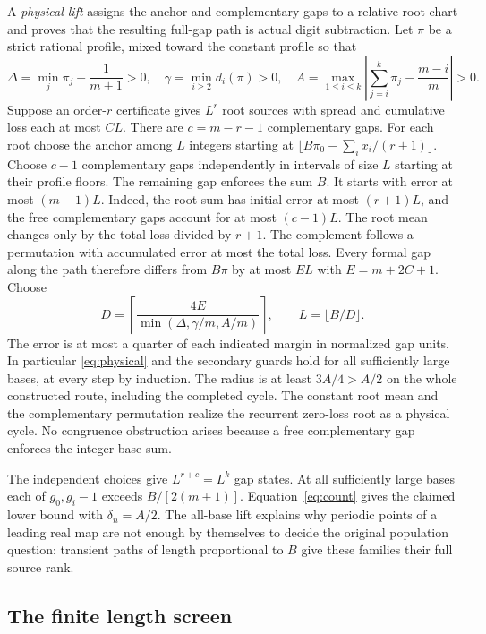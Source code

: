 \documentclass[11pt,reqno]{amsart}
\theoremstyle{remark}
\begin{document}
A \emph{physical lift} assigns the anchor and complementary gaps
to a relative root chart and proves that the resulting full-gap path
is actual digit subtraction. Let \(\pi\) be a strict rational profile,
mixed toward the constant profile so that
\[
 \Delta=\min_j\pi_j-\frac1{m+1}>0,\quad
 \gamma=\min_{i\ge2}d_i(\pi)>0,\quad
 A=\max_{1\le i\le k}\left|\sum_{j=i}^k\pi_j-\frac{m-i}{m}\right|>0.
\]
Suppose an order-\(r\) certificate gives \(L^r\) root sources with
spread and cumulative loss each at most \(CL\).
There are \(c=m-r-1\) complementary gaps. For each root choose the
anchor among \(L\) integers starting at
\(\lfloor B\pi_0-\sum_i x_i/(r+1)\rfloor\).
Choose \(c-1\) complementary gaps independently in intervals of size
\(L\) starting at their profile floors. The remaining gap enforces
the sum \(B\). It starts with error at most \((m-1)L\).
Indeed, the root sum has initial error at most \((r+1)L\), and the
free complementary gaps account for at most \((c-1)L\).
The root mean changes only by the total loss divided by \(r+1\).
The complement follows a permutation with accumulated error at
most the total loss. Every formal gap along the path therefore
differs from \(B\pi\) by at most \(EL\) with \(E=m+2C+1\).
Choose
\begin{equation}\label{eq:D}
       D=\left\lceil\frac{4E}{\min(\Delta,\gamma/m,A/m)}\right\rceil,
                       \qquad L=\lfloor B/D\rfloor.
\end{equation}
The error is at most a quarter of each indicated margin in
normalized gap units. In particular \eqref{eq:physical} and the
secondary guards hold for all sufficiently large bases, at every step
by induction. The radius is at least \(3A/4>A/2\) on the whole
constructed route, including the completed cycle. The constant
root mean and the complementary permutation realize the recurrent
zero-loss root as a physical cycle. No congruence obstruction
arises because a free complementary gap enforces the integer base sum.

The independent choices give \(L^{r+c}=L^k\) gap states. At all
sufficiently large bases each of \(g_0,g_i-1\) exceeds
\(B/[2(m+1)]\). Equation~\eqref{eq:count} gives the claimed lower
bound with \(\delta_n=A/2\). The all-base lift explains why
periodic points of a leading real map are not enough by themselves
to decide the original population question: transient paths
of length proportional to \(B\) give these families their full
source rank.

\subsection{The finite length screen}
\end{document}
